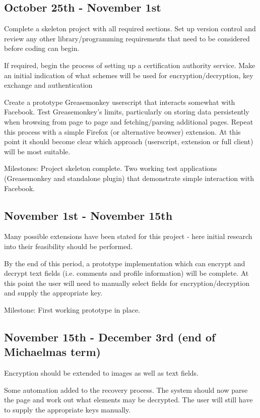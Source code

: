 \subsection*{October 25th - November 1st}

Complete a skeleton project with all required sections. Set up version control and review any other library/programming requirements that need to be considered before coding can begin.

If required, begin the process of setting up a certification authority service. Make an initial indication of what schemes will be used for encryption/decryption, key exchange and authentication

Create a prototype Greasemonkey userscript that interacts somewhat with Facebook. Test Greasemonkey's limits, particularly on storing data persistently when browsing from page to page and fetching/parsing additional pages. Repeat this process with a simple Firefox (or alternative browser) extension. At this point it should become clear which approach (userscript, extension or full client) will be most suitable.

Milestones: Project skeleton complete. Two working test applications (Greasemonkey and standalone plugin) that demonstrate simple interaction with Facebook.


\subsection*{November 1st - November 15th}

Many possible extensions have been stated for this project - here initial research into their feasibility should be performed.

By the end of this period, a prototype implementation which can encrypt and decrypt text fields (i.e. comments and profile information) will be complete. At this point the user will need to manually select fields for encryption/decryption and supply the appropriate key.

Milestone: First working prototype in place.

\subsection*{November 15th - December 3rd (end of Michaelmas term)}

Encryption should be extended to images as well as text fields.

Some automation added to the recovery process. The system should now parse the page and work out what elements may be decrypted. The user will still have to supply the appropriate keys manually.

